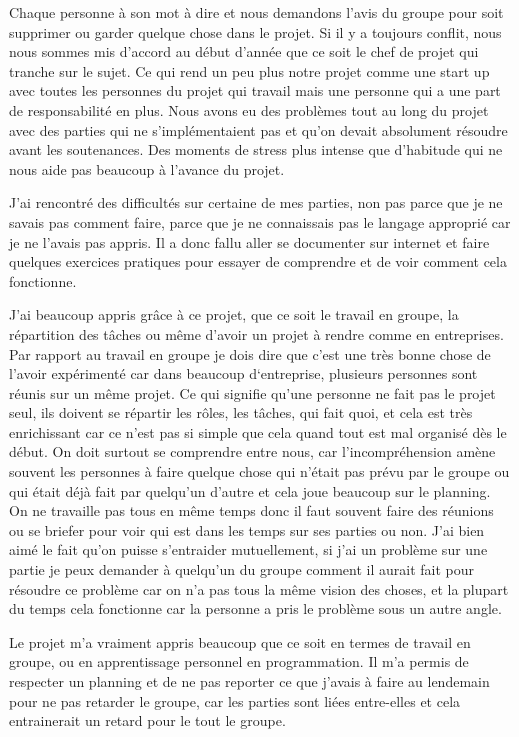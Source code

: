 \documentclass[11pt]{report}
\begin{document}
Chaque personne à son mot à dire et nous demandons l’avis du groupe pour soit supprimer ou garder quelque chose dans le projet. Si il y a toujours conflit, nous nous sommes mis d’accord au début d’année que ce soit le chef de projet qui tranche sur le sujet. Ce qui rend un peu plus notre projet comme une start up avec toutes les personnes du projet qui travail mais une personne qui a une part de responsabilité en plus.
Nous avons eu des problèmes tout au long du projet avec des parties qui ne s’implémentaient pas et qu’on devait absolument résoudre avant les soutenances. Des moments de stress plus intense que d’habitude qui ne nous aide pas beaucoup à l’avance du projet.

J’ai rencontré des difficultés sur certaine de mes parties, non pas parce que je ne savais pas comment faire, parce que je ne connaissais pas le langage approprié car je ne l’avais pas appris. Il a donc fallu aller se documenter sur internet et faire quelques exercices pratiques pour essayer de comprendre et de voir comment cela fonctionne.

J’ai beaucoup appris grâce à ce projet, que ce soit le travail en groupe, la répartition des tâches ou même d’avoir un projet à rendre comme en entreprises. Par rapport au travail en groupe je dois dire que c’est une très bonne chose de l’avoir expérimenté car dans beaucoup d‘entreprise, plusieurs personnes sont réunis sur un même projet. Ce qui signifie qu’une personne ne fait pas le projet seul, ils doivent se répartir les rôles, les tâches, qui fait quoi, et cela est très enrichissant car ce n’est pas si simple que cela quand tout est mal organisé dès le début. On doit surtout se comprendre entre nous, car l’incompréhension amène souvent les personnes à faire quelque chose qui n’était pas prévu par le groupe ou qui était déjà fait par quelqu’un d’autre et cela joue beaucoup sur le planning. On ne travaille pas tous en même temps donc il faut souvent faire des réunions ou se briefer pour voir qui est dans les temps sur ses parties ou non. J’ai bien aimé le fait qu’on puisse s’entraider mutuellement, si j’ai un problème sur une partie je peux demander à quelqu’un du groupe comment il aurait fait pour résoudre ce problème car on n’a pas tous la même vision des choses, et la plupart du temps cela fonctionne car la personne a pris le problème sous un autre angle.

Le projet m’a vraiment appris beaucoup que ce soit en termes de travail en groupe, ou en apprentissage personnel en programmation. Il m’a permis de respecter un planning et de ne pas reporter ce que j’avais à faire au lendemain pour ne pas retarder le groupe, car les parties sont liées entre-elles et cela entrainerait un retard pour le tout le groupe. 
\end{document}
